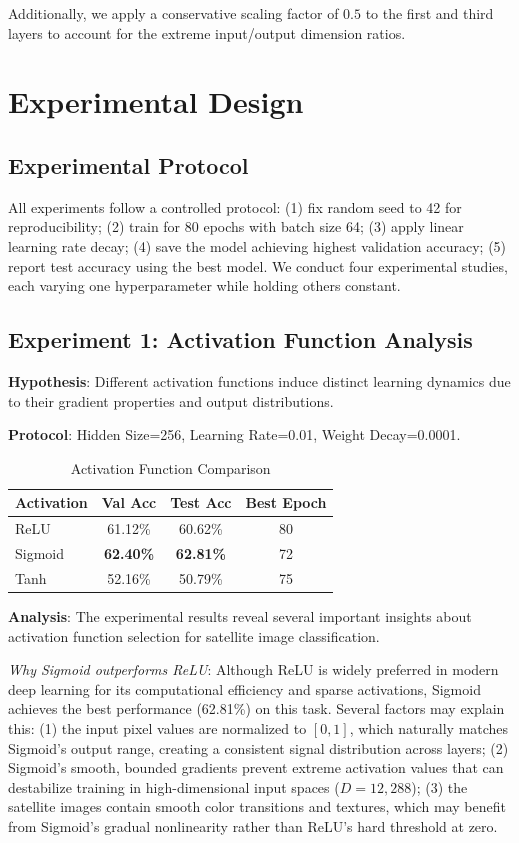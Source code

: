 \documentclass[sigconf,nonacm]{acmart}
\begin{document}
Additionally, we apply a conservative scaling factor of $0.5$ to the first and third layers to account for the extreme input/output dimension ratios.

\section{Experimental Design}

\subsection{Experimental Protocol}

All experiments follow a controlled protocol: (1) fix random seed to 42 for reproducibility; (2) train for 80 epochs with batch size 64; (3) apply linear learning rate decay; (4) save the model achieving highest validation accuracy; (5) report test accuracy using the best model. We conduct four experimental studies, each varying one hyperparameter while holding others constant.

\subsection{Experiment 1: Activation Function Analysis}

\textbf{Hypothesis}: Different activation functions induce distinct learning dynamics due to their gradient properties and output distributions.

\textbf{Protocol}: Hidden Size=256, Learning Rate=0.01, Weight Decay=0.0001.

\begin{table}[htbp]
\caption{Activation Function Comparison}
\label{tab:activation}
\centering
\small
\begin{tabular}{lccc}
\toprule
Activation & Val Acc & Test Acc & Best Epoch \\
\midrule
ReLU & 61.12\% & 60.62\% & 80 \\
Sigmoid & \textbf{62.40\%} & \textbf{62.81\%} & 72 \\
Tanh & 52.16\% & 50.79\% & 75 \\
\bottomrule
\end{tabular}
\end{table}

\textbf{Analysis}: The experimental results reveal several important insights about activation function selection for satellite image classification.

\textit{Why Sigmoid outperforms ReLU}: Although ReLU is widely preferred in modern deep learning for its computational efficiency and sparse activations, Sigmoid achieves the best performance (62.81\%) on this task. Several factors may explain this: (1) the input pixel values are normalized to $[0, 1]$, which naturally matches Sigmoid's output range, creating a consistent signal distribution across layers; (2) Sigmoid's smooth, bounded gradients prevent extreme activation values that can destabilize training in high-dimensional input spaces ($D=12{,}288$); (3) the satellite images contain smooth color transitions and textures, which may benefit from Sigmoid's gradual nonlinearity rather than ReLU's hard threshold at zero.
\end{document}
